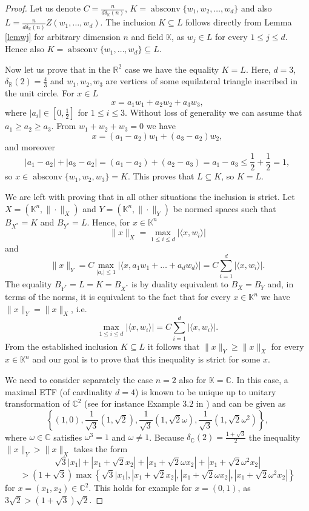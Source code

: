\documentclass[12pt, reqno]{amsart}
\theoremstyle{definition}
\theoremstyle{remark}
\numberwithin{equation}{section}
\DeclareMathOperator{\absconv}{absconv}
\begin{document}
\begin{proof} Let us denote $C=\frac{n}{d\delta_{\mathbb{K}}(n)}$, $K = \absconv \{w_1, w_2, \ldots, w_d\}$ and also $L=\frac{n}{d\delta_{\mathbb{K}}(n)} Z(w_1, \ldots, w_d)$. The inclusion $K \subseteq L$ follows directly from Lemma \ref{lemwj} for arbitrary dimension $n$ and field $\mathbb{K}$, as $w_j \in L$ for every $1 \leq j \leq d$. Hence also $K = \absconv \{w_1, \ldots, w_d \} \subseteq L$.

Now let us prove that in the $\mathbb{R}^2$ case we have the equality $K=L$. Here, $d=3$, $\delta_{\mathbb{R}}(2)=\frac{4}{3}$ and $w_1, w_2, w_3$ are vertices of some equilateral triangle inscribed in the unit circle. For $x \in L$
$$x =  a_1w_1 + a_2w_2 + a_3w_3,$$
where $|a_i| \in \left [ 0, \frac{1}{2} \right ]$ for $1 \leq i \leq 3$. Without loss of generality we can assume that $a_1 \geq a_2 \geq a_3$. From $w_1+w_2+w_3=0$ we have
$$x = (a_1-a_2)w_1 + (a_3-a_2)w_2,$$
and moreover
$$|a_1 - a_2| + |a_3-a_2|=(a_1-a_2)+(a_2-a_3)=a_1-a_3 \leq \frac{1}{2} + \frac{1}{2}=1,$$
so $x \in \absconv \{w_1, w_2, w_3 \}=K$. This proves that $L \subseteq K$, so $K=L$.



We are left with proving that in all other situations the inclusion is strict. Let $X=(\mathbb{K}^n, \| \cdot \|_X)$ and $Y=(\mathbb{K}^n, \| \cdot \|_Y)$ be normed spaces such that $B_{X^*}=K$ and $B_{Y^*}=L$. Hence, for $x \in \mathbb{K}^n$
$$\|x\|_X = \max_{1 \leq i \leq d} |\langle x, w_i \rangle|$$
and
$$\|x\|_Y=C \max_{|a_i| \leq 1} |\langle x, a_1w_1 + \ldots + a_dw_d \rangle | = C \sum_{i=1}^{d} | \langle x, w_i \rangle |.$$
The equality $B_{Y^*}=L = K=B_{X^*}$ is by duality equivalent to $B_X = B_Y$ and, in terms of the norms, it is equivalent to the fact that for every $x \in \mathbb{K}^n$ we have $\|x\|_Y = \|x\|_X$, i.e.
\begin{equation}
\label{eqnorms}
\max_{1 \leq i \leq d} |\langle x, w_i \rangle| =  C \sum_{i=1}^{d} | \langle x, w_i \rangle |.
\end{equation}
From the established inclusion $K \subseteq L$ it follows that $\|x\|_Y \geq \|x\|_X$ for every $x \in \mathbb{K}^n$ and our goal is to prove that this inequality is strict for some $x$.


We need to consider separately the case $n=2$ also for $\mathbb{K}=\mathbb{C}$. In this case, a maximal ETF (of cardinality $d=4$) is known to be unique up to unitary transformation of $\mathbb{C}^2$ (see for instance Example $3.2$ in \cite{hughstonsalamon}) and can be given as
$$\left \{ \left (1, 0 \right ), \frac{1}{\sqrt{3}}\left ( 1, \sqrt{2} \right ), \frac{1}{\sqrt{3}} \left (1, \sqrt{2}\omega \right ), \frac{1}{\sqrt{3}} \left  ( 1, \sqrt{2}\omega^2 \right )  \right\},$$
where $\omega \in \mathbb{C}$ satisfies $\omega^3=1$ and $\omega \neq 1$. Because $\delta_{\mathbb{C}}(2)=\frac{1+\sqrt{3}}{2}$ the inequality $\|x\|_Y > \|x\|_X$ takes the form
$$\sqrt{3}|x_1| + |x_1 + \sqrt{2}x_2| + |x_1 + \sqrt{2}\omega x_2| + |x_1 + \sqrt{2}\omega^2x_2|$$
$$> (1+\sqrt{3}) \max \left \{ \sqrt{3}|x_1|, |x_1 + \sqrt{2}x_2|, |x_1 + \sqrt{2}\omega x_2|, |x_1 + \sqrt{2}\omega^2x_2| \right \}$$
for $x=(x_1, x_2) \in \mathbb{C}^2$. This holds for example for $x=(0, 1)$, as $3\sqrt{2} > (1+\sqrt{3})\sqrt{2}.$


\end{proof}
\end{document}
